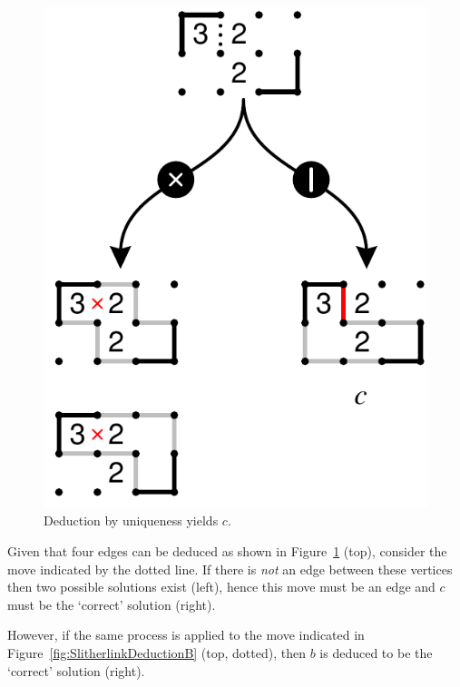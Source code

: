\documentclass{gapd}
\begin{document}
\begin{figure}[htb]
  \centering
  \includegraphics[width=0.85\columnwidth]{graphics/slitherlink-deduce-a2.pdf}
  \caption{Deduction by uniqueness yields $c$.}
  \label{fig:SlitherlinkDeductionA}
\end{figure}

Given that four edges can be deduced as shown in
Figure~\ref{fig:SlitherlinkDeductionA} (top), consider the move
indicated by the dotted line.  If there is \textit{not} an edge between
these vertices then two possible solutions exist (left), hence this
move must be an edge and $c$ must be the `correct' solution (right).

However, if the same process is applied to the move indicated in
Figure~\ref{fig:SlitherlinkDeductionB} (top, dotted), then $b$ is
deduced to be the `correct' solution (right).
\end{document}

